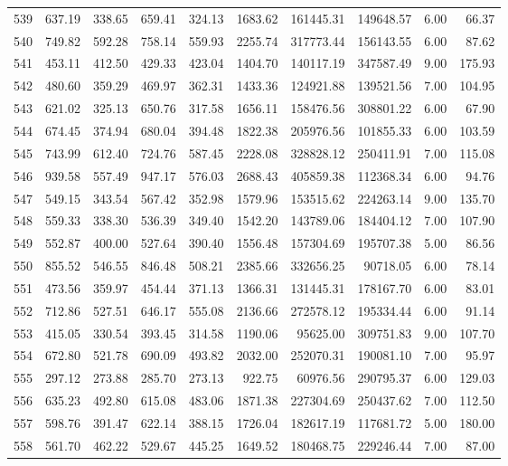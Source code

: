 \begin{tabular}{lrrrrrrrrr}
539 & 637.19 & 338.65 & 659.41 & 324.13 & 1683.62 & 161445.31 & 149648.57 & 6.00 & 66.37 \\
540 & 749.82 & 592.28 & 758.14 & 559.93 & 2255.74 & 317773.44 & 156143.55 & 6.00 & 87.62 \\
541 & 453.11 & 412.50 & 429.33 & 423.04 & 1404.70 & 140117.19 & 347587.49 & 9.00 & 175.93 \\
542 & 480.60 & 359.29 & 469.97 & 362.31 & 1433.36 & 124921.88 & 139521.56 & 7.00 & 104.95 \\
543 & 621.02 & 325.13 & 650.76 & 317.58 & 1656.11 & 158476.56 & 308801.22 & 6.00 & 67.90 \\
544 & 674.45 & 374.94 & 680.04 & 394.48 & 1822.38 & 205976.56 & 101855.33 & 6.00 & 103.59 \\
545 & 743.99 & 612.40 & 724.76 & 587.45 & 2228.08 & 328828.12 & 250411.91 & 7.00 & 115.08 \\
546 & 939.58 & 557.49 & 947.17 & 576.03 & 2688.43 & 405859.38 & 112368.34 & 6.00 & 94.76 \\
547 & 549.15 & 343.54 & 567.42 & 352.98 & 1579.96 & 153515.62 & 224263.14 & 9.00 & 135.70 \\
548 & 559.33 & 338.30 & 536.39 & 349.40 & 1542.20 & 143789.06 & 184404.12 & 7.00 & 107.90 \\
549 & 552.87 & 400.00 & 527.64 & 390.40 & 1556.48 & 157304.69 & 195707.38 & 5.00 & 86.56 \\
550 & 855.52 & 546.55 & 846.48 & 508.21 & 2385.66 & 332656.25 & 90718.05 & 6.00 & 78.14 \\
551 & 473.56 & 359.97 & 454.44 & 371.13 & 1366.31 & 131445.31 & 178167.70 & 6.00 & 83.01 \\
552 & 712.86 & 527.51 & 646.17 & 555.08 & 2136.66 & 272578.12 & 195334.44 & 6.00 & 91.14 \\
553 & 415.05 & 330.54 & 393.45 & 314.58 & 1190.06 & 95625.00 & 309751.83 & 9.00 & 107.70 \\
554 & 672.80 & 521.78 & 690.09 & 493.82 & 2032.00 & 252070.31 & 190081.10 & 7.00 & 95.97 \\
555 & 297.12 & 273.88 & 285.70 & 273.13 & 922.75 & 60976.56 & 290795.37 & 6.00 & 129.03 \\
556 & 635.23 & 492.80 & 615.08 & 483.06 & 1871.38 & 227304.69 & 250437.62 & 7.00 & 112.50 \\
557 & 598.76 & 391.47 & 622.14 & 388.15 & 1726.04 & 182617.19 & 117681.72 & 5.00 & 180.00 \\
558 & 561.70 & 462.22 & 529.67 & 445.25 & 1649.52 & 180468.75 & 229246.44 & 7.00 & 87.00 \\

\end{tabular}
